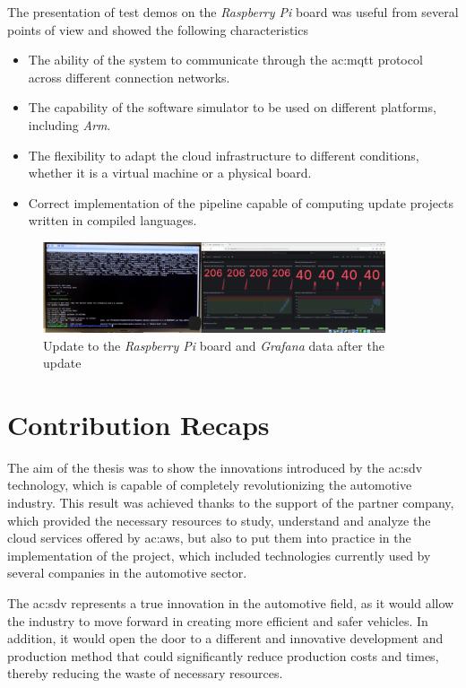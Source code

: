The presentation of test demos on the \textit{Raspberry Pi} board was useful from several points of view and showed the following characteristics
\begin{itemize}
    \item The ability of the system to communicate through the \gls{ac:mqtt} protocol across different connection networks.
    \item The capability of the software simulator to be used on different platforms, including \textit{Arm}.
    \item The flexibility to adapt the cloud infrastructure to different conditions, whether it is a virtual machine or a physical board.
    \item Correct implementation of the pipeline capable of computing update projects written in compiled languages.
\end{itemize}
\begin{figure}[h]  %
    \centering
    \includegraphics[width=0.9\textwidth]{images/RaspberryPiDemoUpdate.png}  %
    \caption{Update to the \textit{Raspberry Pi} board and \textit{Grafana} data after the update}
    \label{fig:RaspberryPiDemoUpdate}
\end{figure}

\section{Contribution Recaps}
The aim of the thesis was to show the innovations introduced by the \gls{ac:sdv} technology, which is capable of completely revolutionizing the automotive industry. This result was achieved thanks to the support of the partner company, which provided the necessary resources to study, understand and analyze the cloud services offered by \gls{ac:aws}, but also to put them into practice in the implementation of the project, which included technologies currently used by several companies in the automotive sector.

The \gls{ac:sdv} represents a true innovation in the automotive field, as it would allow the industry to move forward in creating more efficient and safer vehicles. In addition, it would open the door to a different and innovative development and production method that could significantly reduce production costs and times, thereby reducing the waste of necessary resources.

